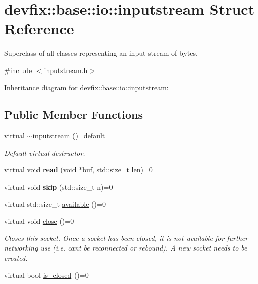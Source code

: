 \hypertarget{structdevfix_1_1base_1_1io_1_1inputstream}{}\section{devfix\+:\+:base\+:\+:io\+:\+:inputstream Struct Reference}
\label{structdevfix_1_1base_1_1io_1_1inputstream}


Superclass of all classes representing an input stream of bytes.  




{\ttfamily \#include $<$inputstream.\+h$>$}



Inheritance diagram for devfix\+:\+:base\+:\+:io\+:\+:inputstream\+:
\subsection*{Public Member Functions}
\begin{DoxyCompactItemize}
\item 
virtual \hyperlink{structdevfix_1_1base_1_1io_1_1inputstream_a1da9f4c189be9ee315caabd2b4fdc125}{$\sim$inputstream} ()=default
\begin{DoxyCompactList}\small\item\em Default virtual destructor. \end{DoxyCompactList}\item 
\mbox{\label{structdevfix_1_1base_1_1io_1_1inputstream_a17e1a21881ae263650ebdaafaee2e71a}} 
virtual void {\bfseries read} (void $\ast$buf, std\+::size\+\_\+t len)=0
\item 
\mbox{\label{structdevfix_1_1base_1_1io_1_1inputstream_a1868a733fd646b29daae6874e07e4e03}} 
virtual void {\bfseries skip} (std\+::size\+\_\+t n)=0
\item 
virtual std\+::size\+\_\+t \hyperlink{structdevfix_1_1base_1_1io_1_1inputstream_ace04813af676b6c81fa452eb4d81a796}{available} ()=0
\item 
\mbox{\label{structdevfix_1_1base_1_1io_1_1inputstream_a1188eff97757eb9625be91dfeca17af7}} 
virtual void \hyperlink{structdevfix_1_1base_1_1io_1_1inputstream_a1188eff97757eb9625be91dfeca17af7}{close} ()=0
\begin{DoxyCompactList}\small\item\em Closes this socket. Once a socket has been closed, it is not available for further networking use (i.\+e. can\textquotesingle{}t be reconnected or rebound). A new socket needs to be created. \end{DoxyCompactList}\item 
virtual bool \hyperlink{structdevfix_1_1base_1_1io_1_1inputstream_a9da6b400424ff476ed0479193c219fa9}{is\+\_\+closed} ()=0
\end{DoxyCompactItemize}


